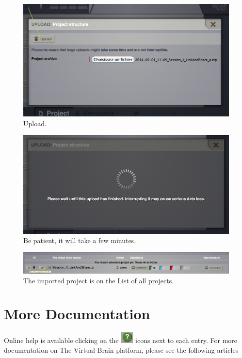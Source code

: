 \documentclass{tufte-handout}
\begin{document}
\begin{figure}[h]
  \includegraphics[width=\linewidth]{Handout_UI_ImportingProjects_Upload}%
  \caption{Upload.}%
  \label{fig:importupload}%
\end{figure}

\begin{figure}[h]
  \includegraphics[width=\linewidth]{Handout_UI_ImportingProjects_Wait}%
  \caption{Be patient, it will take a few minutes.}%
  \label{fig:importwait}%
\end{figure}

\begin{figure}[h]
  \includegraphics[width=\linewidth]{Handout_UI_ImportingProjects_Done}%
  \caption{The imported project is on the \underline{List of all projects}.}%
  \label{fig:importdone}%
\end{figure}




\section{More Documentation}\label{sec:more-doc}
Online help is available clicking on the \includegraphics[width=0.05\textwidth]{butt_green_help} icons next to each entry.
For more documentation on The Virtual Brain platform, please see the following articles \citep{Sanz-Leon_2013, Woodman_2014}
\end{document}
